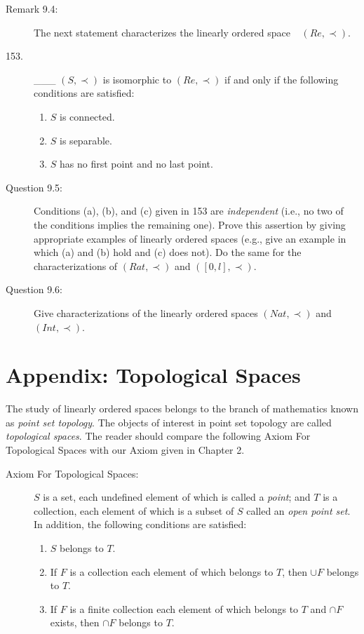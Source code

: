 \documentclass{book}
\begin{document}
\begin{description}
\item[Remark 9.4:] The next statement characterizes the linearly ordered space $\ \ $ $(Re, \prec)$.

\item[153.] \_\_\_ $(S, \prec)$ is isomorphic to $(Re, \prec)$ if and only if the following conditions are satisfied:
\begin{enumerate}[\hspace{1cm}(a)]
  \item $S$ is connected.
  \item $S$ is separable.
  \item $S$ has no first point and no last point.
\end{enumerate}

\item[Question 9.5:] Conditions (a), (b), and (c) given in 153 are \emph{independent} (i.e., no two of the conditions implies the remaining one). Prove this assertion by giving appropriate examples of linearly ordered spaces (e.g., give an example in which (a) and (b) hold and (c) does not). Do the same for the characterizations of $(Rat,\prec)$ and $([0,l],\prec)$.

\item[Question 9.6:] Give characterizations of the linearly ordered spaces $(Nat,\prec)$ and $(Int,\prec)$.


\end{description}





\chapter*{Appendix: Topological Spaces}


The study of linearly ordered spaces belongs to the branch of mathematics known as \emph{point set topology}. The objects of interest in point set topology are called \emph{topological spaces}. The reader should compare the following Axiom For Topological Spaces with our Axiom given in Chapter 2.

\begin{description}

\item[Axiom For Topological Spaces:] $S$ is a set, each undefined element of which is called a \emph{point}; and $T$ is a collection, each element of which is a subset of $S$ called an \emph{open point set}. In addition, the following conditions are satisfied: 
\begin{enumerate}[\hspace{1cm}(a)]
  \item $S$ belongs to $T$.
  \item If $F$ is a collection each element of which belongs to $T$, then $\cup F$ belongs to $T$.
  \item If $F$ is a finite collection each element of which belongs to $T$ and $\cap F$ exists, then $\cap F$ belongs to $T$.
\end{enumerate}

\end{description}
\end{document}

